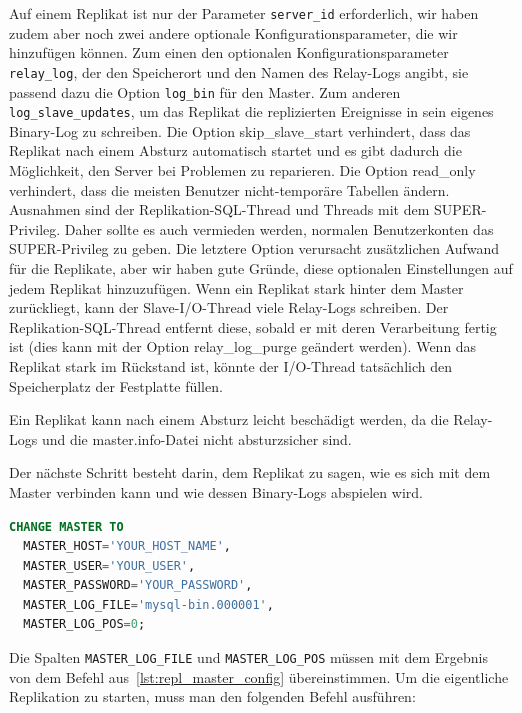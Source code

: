 Auf einem Replikat ist nur der Parameter \texttt{server\_id} erforderlich, wir haben zudem aber noch zwei andere optionale Konfigurationsparameter, die wir hinzufügen können.
Zum einen den optionalen Konfigurationsparameter \texttt{relay\_log}, der den Speicherort und den Namen des Relay-Logs angibt, sie passend dazu die Option \texttt{log\_bin} für den Master.
Zum anderen \texttt{log\_slave\_updates}, um das Replikat die replizierten Ereignisse in sein eigenes Binary-Log zu schreiben.
Die Option skip\_slave\_start verhindert, dass das Replikat nach einem Absturz automatisch startet und es gibt dadurch die Möglichkeit, den Server bei Problemen zu reparieren.
Die Option read\_only verhindert, dass die meisten Benutzer nicht-temporäre Tabellen ändern.
Ausnahmen sind der Replikation-SQL-Thread und Threads mit dem SUPER-Privileg.
Daher sollte es auch vermieden werden, normalen Benutzerkonten das SUPER-Privileg zu geben.
Die letztere Option verursacht zusätzlichen Aufwand für die Replikate, aber wir haben gute Gründe, diese optionalen Einstellungen auf jedem Replikat hinzuzufügen.
Wenn ein Replikat stark hinter dem Master zurückliegt, kann der Slave-I/O-Thread viele Relay-Logs schreiben.
Der Replikation-SQL-Thread entfernt diese, sobald er mit deren Verarbeitung fertig ist (dies kann mit der Option relay\_log\_purge geändert werden).
Wenn das Replikat stark im Rückstand ist, könnte der I/O-Thread tatsächlich den Speicherplatz der Festplatte füllen.

Ein Replikat kann nach einem Absturz leicht beschädigt werden, da die Relay-Logs und die master.info-Datei nicht absturzsicher sind.

Der nächste Schritt besteht darin, dem Replikat zu sagen, wie es sich mit dem Master verbinden kann und wie dessen Binary-Logs abspielen wird.

\vspace{-5pt}
\begin{lstlisting}[language=SQL,caption=Verbindung der Replica zum Master,label={lst:repl_con_replica_master}]
CHANGE MASTER TO
  MASTER_HOST='YOUR_HOST_NAME',
  MASTER_USER='YOUR_USER',
  MASTER_PASSWORD='YOUR_PASSWORD',
  MASTER_LOG_FILE='mysql-bin.000001',
  MASTER_LOG_POS=0;
\end{lstlisting}
\vspace{-5pt}

Die Spalten \texttt{MASTER\_LOG\_FILE} und \texttt{MASTER\_LOG\_POS} müssen mit dem Ergebnis von dem Befehl aus~\ref{lst:repl_master_config} übereinstimmen.
Um die eigentliche Replikation zu starten, muss man den folgenden Befehl ausführen:

